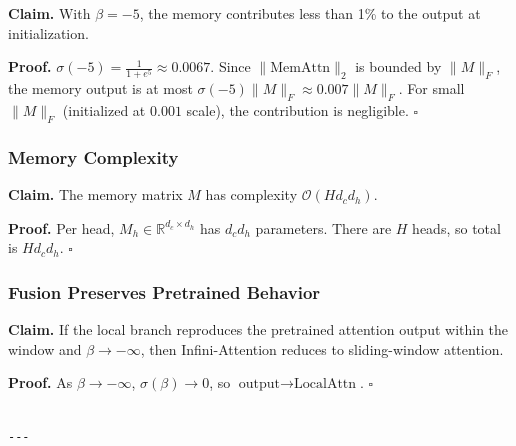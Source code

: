 \textbf{Claim.} With $\beta = -5$, the memory contributes less than 1\% to the 
output at initialization.

\textbf{Proof.} $\sigma(-5) = \frac{1}{1 + e^5} \approx 0.0067$. Since 
$\|\text{MemAttn}\|_2$ is bounded by $\|M\|_F$, the memory output is at 
most $\sigma(-5) \|M\|_F \approx 0.007 \|M\|_F$. For small $\|M\|_F$ 
(initialized at $0.001$ scale), the contribution is negligible. $\square$

\subsubsection{Memory Complexity}

\textbf{Claim.} The memory matrix $M$ has complexity $\mathcal{O}(H d_c d_h)$.

\textbf{Proof.} Per head, $M_h \in \mathbb{R}^{d_c \times d_h}$ has $d_c d_h$ 
parameters. There are $H$ heads, so total is $H d_c d_h$. $\square$

\subsubsection{Fusion Preserves Pretrained Behavior}

\textbf{Claim.} If the local branch reproduces the pretrained attention output 
within the window and $\beta \to -\infty$, then Infini-Attention reduces to 
sliding-window attention.

\textbf{Proof.} As $\beta \to -\infty$, $\sigma(\beta) \to 0$, so 
$\text{output} \to \text{LocalAttn}$. $\square$
\begin{lstlisting}

---
\end{lstlisting}